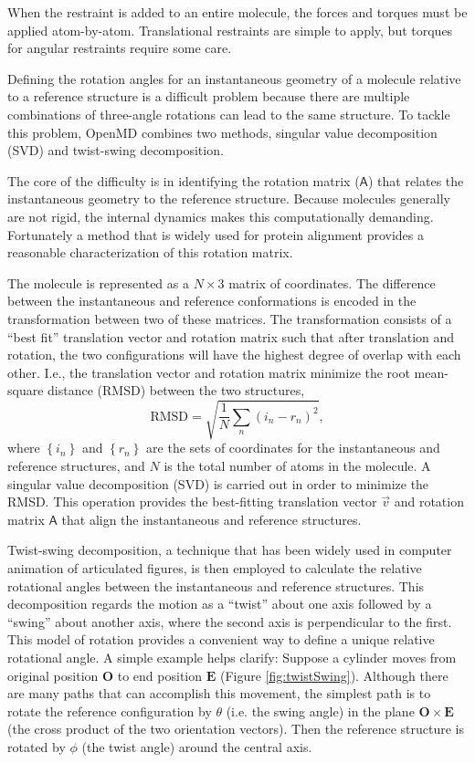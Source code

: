 \documentclass[letterpaper]{report}
\begin{document}
When the restraint is added to an entire molecule, the forces and
torques must be applied atom-by-atom. Translational restraints are
simple to apply, but torques for angular restraints require some
care. 

Defining the rotation angles for an instantaneous geometry of a
molecule relative to a reference structure is a difficult problem
because there are multiple combinations of three-angle rotations can
lead to the same structure. To tackle this problem, OpenMD combines
two methods, singular value decomposition (SVD) and twist-swing
decomposition.

The core of the difficulty is in identifying the rotation matrix
($\mathsf{A}$) that relates the instantaneous geometry to the
reference structure.  Because molecules generally are not rigid, the
internal dynamics makes this computationally demanding. Fortunately a
method that is widely used for protein alignment provides a reasonable
characterization of this rotation matrix.

The molecule is represented as a $N \times 3$ matrix of coordinates.
The difference between the instantaneous and reference conformations
is encoded in the transformation between two of these matrices.  The
transformation consists of a ``best fit'' translation vector and
rotation matrix such that after translation and rotation, the two
configurations will have the highest degree of overlap with each
other.  I.e., the translation vector and rotation matrix minimize the
root mean-square distance (RMSD) between the two structures,
\begin{equation}
  \mathrm{RMSD} = \sqrt{\frac{1}{N} \sum_n \left(i_n - r_n\right)^2 },
\end{equation}
where $\left\{i_n\right\}$ and $\left\{r_n\right\}$ are the sets of
coordinates for the instantaneous and reference structures, and $N$ is
the total number of atoms in the molecule.  A singular value
decomposition (SVD) is carried out in order to minimize the RMSD.
This operation provides the best-fitting translation vector $\vec{v}$
and rotation matrix $\mathsf{A}$ that align the instantaneous and
reference structures.

Twist-swing decomposition, a technique that has been widely used in
computer animation of articulated figures, is then employed to
calculate the relative rotational angles between the instantaneous and
reference structures.  This decomposition regards the motion as a
``twist'' about one axis followed by a ``swing'' about another axis,
where the second axis is perpendicular to the
first.\cite{Kallmann:2008fk,Shoemake:1994uq} This model of rotation
provides a convenient way to define a unique relative rotational
angle.  A simple example helps clarify: Suppose a cylinder moves from
original position $\mathbf{O}$ to end position $\mathbf{E}$ (Figure
\ref{fig:twistSwing}).  Although there are many paths that can
accomplish this movement, the simplest path is to rotate the reference
configuration by $\theta$ (i.e. the swing angle) in the plane
$\mathbf{O} \times \mathbf{E}$ (the cross product of the two
orientation vectors).  Then the reference structure is rotated by
$\phi$ (the twist angle) around the central axis.
\end{document}
